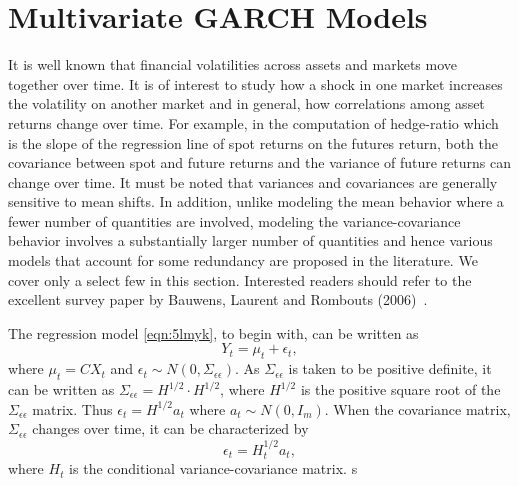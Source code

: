 \section{Multivariate GARCH Models}\label{in:multgarch1} \label{in:modelvar2}

It is well known that financial volatilities across assets and markets move together over time. It is of interest to study how a shock in one market increases the volatility on another market and in general, how correlations among asset returns change over time. For example, in the computation of hedge-ratio which is the slope of the regression line of spot returns on the futures return, both the covariance between spot and future returns and the variance of future returns can change over time. It must be noted that variances and covariances are generally sensitive to mean shifts. In addition, unlike modeling the mean behavior where a fewer number of quantities are involved, modeling the variance-covariance behavior involves a substantially larger number of quantities and hence various models that account for some redundancy are proposed in the literature. We cover only a select few in this section. Interested readers should refer to the excellent survey paper by Bauwens, Laurent and Rombouts (2006)~\cite{laurent}.


The regression model \eqref{eqn:5lmyk}, to begin with, can be written as
	\begin{equation} \label{eqn:3relabel}
	Y_t= \mu_t+\epsilon_t,
	\end{equation}
where $\mu_t=CX_t$ and $\epsilon_t \sim N(0,\Sigma_{\epsilon\epsilon})$. As $\Sigma_{\epsilon\epsilon}$ is taken to be positive definite, it can be written as $\Sigma_{\epsilon\epsilon}= H^{1/2} \cdot H^{1/2}$, where $H^{1/2}$ is the positive square root of the $\Sigma_{\epsilon\epsilon}$ matrix. Thus $\epsilon_t= H^{1/2} a_t$ where $a_t \sim N(0,I_m)$. When the covariance matrix, $\Sigma_{\epsilon\epsilon}$ changes over time, it can be characterized by
	\begin{equation}
	\epsilon_t=H^{1/2}_t a_t,
	\end{equation}
where $H_t$ is the conditional variance-covariance matrix.
s

